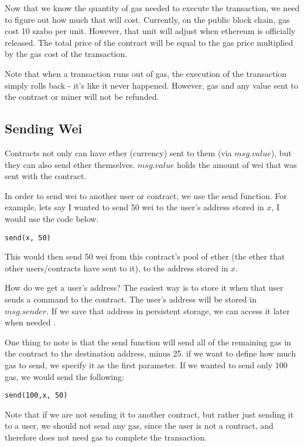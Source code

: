 \documentclass[12pt]{article}
\begin{document}
Now that we know the quantity of gas needed to execute the transaction, we need to figure out how much that will cost. Currently, on the public block chain, gas cost 10 szabo per unit. However, that unit will adjust when ethereum is officially released. The total price of the contract will be equal to the gas price multiplied by the gas cost of the transaction.

Note that when a transaction runs out of gas, the execution of the transaction simply rolls back - it's like it never happened. However, gas and any value sent to the contract or miner will not be refunded. \cite{Subtleties, WhatOptions}

\subsection{Sending Wei}
Contracts not only can have ether (currency) sent to them (via $msg.value$), but they can also send ether themselves. $msg.value$ holds the amount of wei that was sent with the contract.

In order to send wei to another user or contract, we use the send function. For example, lets say I wanted to send 50 wei to the user's address stored in $x$, I would use the code below.

\begin{verbatim}
send(x, 50)
\end{verbatim}

This would then send 50 wei from this contract's pool of ether (the ether that other users/contracts have sent to it), to the address stored in $x$.

How do we get a user's address? The easiest way is to store it when that user sends a command to the contract. The user's address will be stored in $msg.sender$. If we save that address in persistent storage, we can access it later when needed \cite{Serpent}.

One thing to note is that the send function will send all of the remaining gas in the contract to the destination address, minus 25. if we want to define how much gas to send, we specify it as the first parameter. If we wanted to send only 100 gas, we would send the following: 

\begin{verbatim}
send(100,x, 50)
\end{verbatim}

Note that if we are not sending it to another contract, but rather just sending it to a user, we should not send any gas, since the user is not a contract, and therefore does not need gas to complete the transaction. 
\end{document}
